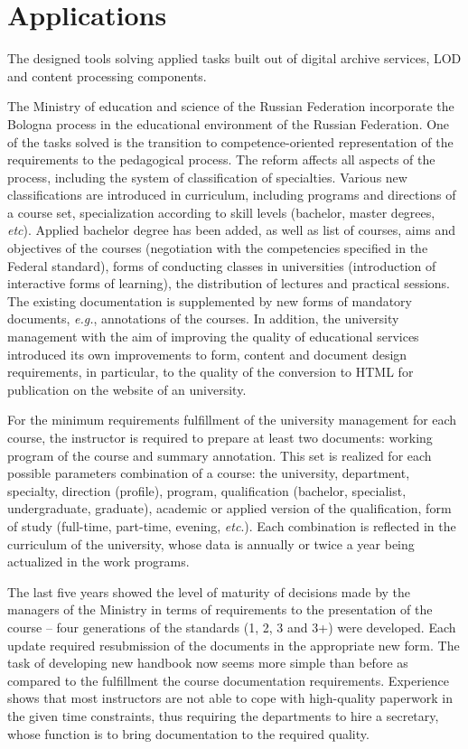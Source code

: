 \documentclass[conference,a4paper]{IEEEtran}
\begin{document}
\section{Applications}

The designed tools solving applied tasks built out of digital archive services, LOD and content processing components.

The Ministry of education and science of the Russian Federation incorporate the Bologna process in the educational environment of the Russian Federation.  One of the tasks solved is the transition to competence-oriented representation of the requirements to the pedagogical process.  The reform affects all aspects of the process, including the system of classification of specialties.  Various new classifications are introduced in curriculum, including programs and directions of a course set, specialization according to skill levels (bachelor, master degrees, \textit{etc}).  Applied bachelor degree has been added, as well as list of courses, aims and objectives of the courses (negotiation with the competencies specified in the Federal standard), forms of conducting classes in universities (introduction of interactive forms of learning), the distribution of lectures and practical sessions.  The existing documentation is supplemented by new forms of mandatory documents, \textit{e.g.}, annotations of the courses.  In addition, the university management with the aim of improving the quality of educational services introduced its own improvements to form, content and document design requirements, in particular, to the quality of the conversion to HTML for publication on the website of an university.

For the minimum requirements fulfillment of the university management for each course, the instructor is required to prepare at least two documents: working program of the course and summary annotation.  This set is realized for each possible parameters combination of a course: the university, department, specialty, direction (profile), program, qualification (bachelor, specialist, undergraduate, graduate), academic or applied version of the qualification, form of study (full-time, part-time, evening, \emph{etc}.).  Each combination is reflected in the curriculum of the university, whose data is annually or twice a year being actualized in the work programs.

The last five years showed the level of maturity of decisions made by the managers of the Ministry in terms of requirements to the presentation of the course -- four generations of the standards (1, 2, 3 and 3+) were developed.  Each update required resubmission of the documents in the appropriate new form.  The task of developing new handbook now seems more simple than before as compared to the fulfillment the course documentation requirements.  Experience shows that most instructors are not able to cope with high-quality paperwork in the given time constraints, thus requiring the departments to hire a secretary, whose function is to bring documentation to the required quality.
\end{document}
